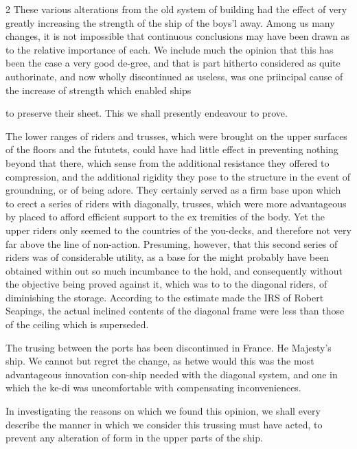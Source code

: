 \documentclass[10pt]{article}
\begin{document}
\begin{multicols}{2}
These various alterations from the old system of building had the effect of very greatly increasing the strength of the ship of the boys'l away. Among us many changes, it is not impossible that continuous conclusions may have been drawn as to the relative importance of each. We include much the opinion that this has been the case a very good de-gree, and that is part hitherto considered as quite authorinate, and now wholly discontinued as useless, was one priincipal cause of the increase of strength which enabled ships

to preserve their sheet. This we shall presently endeavour to prove.

The lower ranges of riders and trusses, which were brought on the upper surfaces of the floors and the fututets, could have had little effect in preventing nothing beyond that there, which sense from the additional resistance they offered to compression, and the additional rigidity they pose to the structure in the event of groundning, or of being adore. They certainly served as a firm base upon which to erect a series of riders with diagonally, trusses, which were more advantageous by placed to afford efficient support to the ex tremities of the body. Yet the upper riders only seemed to the countries of the you-decks, and therefore not very far above the line of non-action. Presuming, however, that this second series of riders was of considerable utility, as a base for the might probably have been obtained within out so much incumbance to the hold, and consequently without the objective being proved against it, which was to to the diagonal riders, of diminishing the storage. According to the estimate made the IRS of Robert Seapings, the actual inclined contents of the diagonal frame were less than those of the ceiling which is superseded.

The trusing between the ports has been discontinued in France. He Majesty's ship. We cannot but regret the change, as hetwe would this was the most advantageous innovation con-ship needed with the diagonal system, and one in which the ke-di was uncomfortable with compensating inconveniences.

In investigating the reasons on which we found this opinion, we shall every describe the manner in which we consider this trussing must have acted, to prevent any alteration of form in the upper parts of the ship.


\end{multicols}
\end{document}
